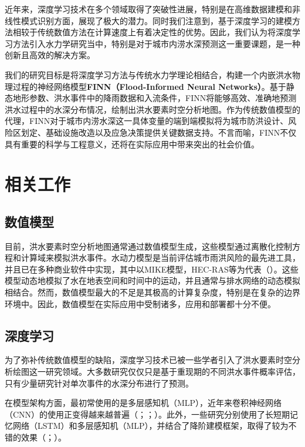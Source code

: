 \documentclass[12pt, a4paper]{article}
\begin{document}
近年来，深度学习技术在多个领域取得了突破性进展，特别是在高维数据建模和非线性模式识别方面，展现了极大的潜力。同时我们注意到，基于深度学习的建模方法相较于传统数值方法在计算速度上有着决定性的优势。因此，我们认为将深度学习方法引入水力学研究当中，特别是对于城市内涝水深预测这一重要课题，是一种创新且高效的解决方案。

我们的研究目标是将深度学习方法与传统水力学理论相结合，构建一个内嵌洪水物理过程的神经网络模型\textbf{FINN（Flood-Informed Neural Networks）}。基于静态地形参数、洪水事件中的降雨数据和入流条件，FINN将能够高效、准确地预测洪水过程中的水深分布情况，绘制出洪水要素时空分析地图。作为传统数值模型的代理，FINN对于城市内涝水深这一具体变量的端到端模拟将为城市防洪设计、风险区划定、基础设施改造以及应急决策提供关键数据支持。不言而喻，FINN不仅具有重要的科学与工程意义，还将在实际应用中带来突出的社会价值。

\section{相关工作}

\subsection{数值模型}

目前，洪水要素时空分析地图通常通过数值模型生成，这些模型通过离散化控制方程和计算域来模拟洪水事件。水动力模型是当前评估城市雨洪风险的最先进工具，并且已在多种商业软件中实现，其中以MIKE模型，HEC-RAS等为代表（\citealp{dhi2016mike}）。这些模型动态地模拟了水在地表空间和时间中的运动，并且通常与排水网络的动态模拟相结合。然而，数值模型最大的不足是其极高的计算复杂度，特别是在复杂的边界环境中。因此，数值模型在实际应用中受制诸多，应用和部署都十分不便。
    
\subsection{深度学习}

为了弥补传统数值模型的缺陷，深度学习技术已被一些学者引入了洪水要素时空分析绘图这一研究领域。大多数研究仅仅只是基于重现期的不同洪水事件概率评估，只有少量研究针对单次事件的水深分布进行了预测。

在模型架构方面，最初常使用的是多层感知机（MLP），近年来卷积神经网络（CNN）的使用正变得越来越普遍（\citealp{guo2020data}；\citealp{kabir2020deep}；\citealp{lowe2021u}）。此外，一些研究分别使用了长短期记忆网络（LSTM）和多层感知机（MLP），并结合了降阶建模框架，取得了较为不错的效果（\citealp{hu2019rapid}；\citealp{jacquier2020non}）。
\end{document}
